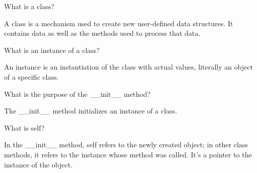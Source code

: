 \begin{blocksection}
\question What is a class?

\begin{solution}[1in]
A class is a mechanism used to create new user-defined data structures. It contains data as well as the methods used to process that data.
\end{solution}

\question What is an instance of a class?

\begin{solution}[1in]
An instance is an instantiation of the class with actual values, literally an object of a specific class.

\end{solution}

\question What is the purpose of the \_\_init\_\_ method?

\begin{solution}[1in]
The \_\_init\_\_ method initializes an instance of a class.

\end{solution}

\question What is self?

\begin{solution}[1in]
In the \_\_init\_\_ method, self refers to the newly created object; in other class methods, it refers to the instance whose method was called. It's a pointer to the instance of the object.
\end{solution}

\end{blocksection}
